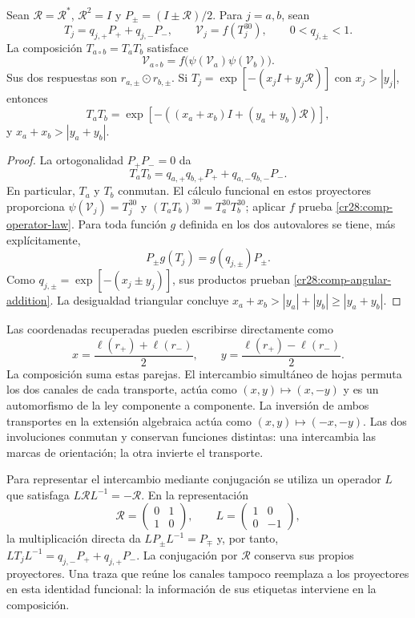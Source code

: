 \begin{proposition}
\label{cr28:comp-operator}
Sean $\mathcal R=\mathcal R^*$, $\mathcal R^2=I$ y
$P_\pm=(I\pm\mathcal R)/2$. Para $j=a,b$, sean
\[
 T_j=q_{j,+}P_++q_{j,-}P_-,\qquad
 \mathcal V_j=f(T_j^{30}),\qquad 0<q_{j,\pm}<1.
\]
La composición $T_{a\circ b}=T_aT_b$ satisface
\begin{equation}
 \mathcal V_{a\circ b}
 =f\bigl(\psi(\mathcal V_a)\psi(\mathcal V_b)\bigr).
 \label{cr28:comp-operator-law}
\end{equation}
Sus dos respuestas son $r_{a,\pm}\odot r_{b,\pm}$. Si
$T_j=\exp[-(x_jI+y_j\mathcal R)]$ con $x_j>|y_j|$, entonces
\begin{equation}
 T_aT_b=
 \exp[-((x_a+x_b)I+(y_a+y_b)\mathcal R)],
 \label{cr28:comp-angular-addition}
\end{equation}
y $x_a+x_b>|y_a+y_b|$.
\end{proposition}
\begin{proof}
La ortogonalidad $P_+P_-=0$ da
\[
 T_aT_b=q_{a,+}q_{b,+}P_++q_{a,-}q_{b,-}P_-.
\]
En particular, $T_a$ y $T_b$ conmutan. El cálculo funcional en estos
proyectores proporciona
$\psi(\mathcal V_j)=T_j^{30}$ y
$(T_aT_b)^{30}=T_a^{30}T_b^{30}$; aplicar $f$ prueba
\eqref{cr28:comp-operator-law}. Para toda función $g$ definida en los
dos autovalores se tiene, más explícitamente,
\[
 P_\pm g(T_j)=g(q_{j,\pm})P_\pm.
\]
Como $q_{j,\pm}=\exp[-(x_j\pm y_j)]$, sus productos prueban
\eqref{cr28:comp-angular-addition}. La desigualdad triangular concluye
$x_a+x_b>|y_a|+|y_b|\geq|y_a+y_b|$.
\end{proof}

Las coordenadas recuperadas pueden escribirse directamente como
\[
 x=\frac{\ell(r_+)+\ell(r_-)}2,\qquad
 y=\frac{\ell(r_+)-\ell(r_-)}2.
\]
La composición suma estas parejas. El intercambio simultáneo de hojas
permuta los dos canales de cada transporte, actúa como
$(x,y)\mapsto(x,-y)$ y es un automorfismo de la ley componente a
componente. La inversión de ambos transportes en la extensión algebraica
actúa como $(x,y)\mapsto(-x,-y)$. Las dos involuciones conmutan y
conservan funciones distintas: una intercambia las marcas de orientación;
la otra invierte el transporte.

Para representar el intercambio mediante conjugación se utiliza un
operador $L$ que satisfaga $L\mathcal R L^{-1}=-\mathcal R$. En la
representación
\[
 \mathcal R=\begin{pmatrix}0&1\\1&0\end{pmatrix},\qquad
 L=\begin{pmatrix}1&0\\0&-1\end{pmatrix},
\]
la multiplicación directa da $LP_\pm L^{-1}=P_\mp$ y, por tanto,
$LT_jL^{-1}=q_{j,-}P_++q_{j,+}P_-$. La conjugación por
$\mathcal R$ conserva sus propios proyectores. Una traza que reúne los
canales tampoco reemplaza a los proyectores en esta identidad funcional:
la información de sus etiquetas interviene en la composición.

